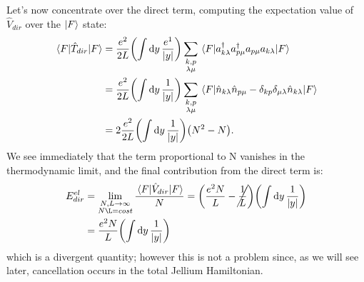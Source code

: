 \documentclass[a4paper]{article}
\begin{document}
\noindent Let's now concentrate over the direct term, computing the expectation value of $\hat{V}_{dir}$ over the $\ket{F}$ state:
\begin{align}
\mel{F}{\hat{T}_{dir}}{F} &= \frac{e^2}{2L} \pqty{\int \dd{y} \frac{e^{1}}{\abs{y}}} \sum_{\substack{k,p\\ \lambda\mu}} \mel{F}{a^\dag_{k\lambda}a^\dag_{p\mu}a_{p\mu}a_{k\lambda}}{F}\\
&= \frac{e^2}{2L} \pqty{\int \dd{y} \frac{1}{\abs{y}}} \sum_{\substack{k,p\\ \lambda\mu}} \mel{F}{\hat{n}_{k\lambda}\hat{n}_{p\mu} - \delta_{kp}\delta_{\mu\lambda}\hat{n}_{k\lambda}}{F}\\
&= 2\frac{e^2}{2L} \pqty{\int \dd{y} \frac{1}{\abs{y}}}\pqty{N^2 - N}.
\end{align}
We see immediately that the term proportional to N vanishes in the thermodynamic limit, and the final contribution from the direct term is:
\begin{align}
E_{dir}^{el} &= \lim_{\substack{N,L \rightarrow \infty\\N\L = cost}} \frac{\mel{F}{\hat{V}_{dir}}{F}}{N} = \pqty{ \frac{e^2N}{L} -\cancel{\frac{1}{L}}} \pqty{\int \dd{y} \frac{1}{\abs{y}}} \\
&= \frac{e^2N}{L}\pqty{\int \dd{y} \frac{1}{\abs{y}}}
\end{align}
which is a divergent quantity; however this is not a problem since, as we will see later, cancellation occurs in the total Jellium Hamiltonian.
\end{document}
